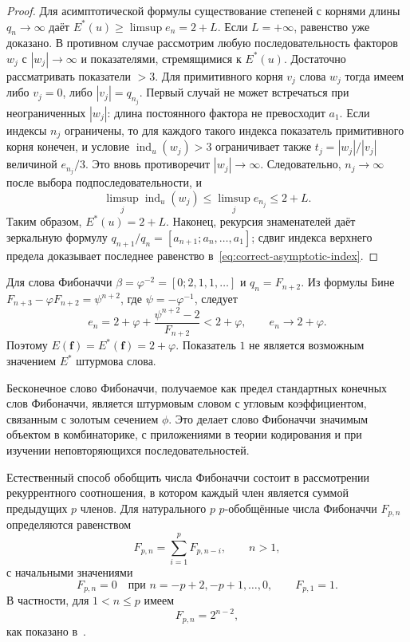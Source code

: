 \documentclass[a4paper,14pt]{extreport}
\theoremstyle{plain}
\theoremstyle{definition}
\theoremstyle{remark}
\begin{document}
\begin{proof}
Для асимптотической формулы существование степеней с корнями
длины $q_n\to\infty$ даёт
$E^*(u)\ge\limsup e_n=2+L$.
Если $L=+\infty$, равенство уже доказано.
В противном случае рассмотрим любую последовательность факторов
$w_j$ с $|w_j|\to\infty$ и показателями, стремящимися к $E^*(u)$.
Достаточно рассматривать показатели $>3$.
Для примитивного корня $v_j$ слова $w_j$ тогда имеем
либо $v_j=0$, либо $|v_j|=q_{n_j}$.
Первый случай не может встречаться при неограниченных $|w_j|$:
длина постоянного фактора не превосходит $a_1$.
Если индексы $n_j$ ограничены, то для каждого такого индекса
показатель примитивного корня конечен, и условие
$\operatorname{ind}_u(w_j)>3$ ограничивает также
$t_j=|w_j|/|v_j|$ величиной $e_{n_j}/3$.
Это вновь противоречит $|w_j|\to\infty$.
Следовательно, $n_j\to\infty$ после выбора подпоследовательности, и
\[
 \limsup_j\operatorname{ind}_u(w_j)
 \le\limsup_j e_{n_j}\le2+L.
\]
Таким образом, $E^*(u)=2+L$.
Наконец, рекурсия знаменателей даёт зеркальную формулу
$q_{n+1}/q_n=[a_{n+1};a_n,\ldots,a_1]$;
сдвиг индекса верхнего предела доказывает последнее равенство
в~\eqref{eq:correct-asymptotic-index}.
\end{proof}

\noindent Для слова Фибоначчи
$\beta=\varphi^{-2}=[0;2,1,1,\ldots]$ и $q_n=F_{n+2}$.
Из формулы Бине
$F_{n+3}-\varphi F_{n+2}=\psi^{n+2}$, где $\psi=-\varphi^{-1}$,
следует
\[
 e_n=2+\varphi+\frac{\psi^{n+2}-2}{F_{n+2}}<2+\varphi,
 \qquad e_n\longrightarrow2+\varphi.
\]
Поэтому $E(\mathbf f)=E^*(\mathbf f)=2+\varphi$.
Показатель $1$ не является возможным значением $E^*$ штурмова слова.

Бесконечное слово Фибоначчи, получаемое как предел стандартных конечных слов Фибоначчи, является штурмовым словом с угловым коэффициентом, связанным с золотым сечением $\phi$. Это делает слово Фибоначчи значимым объектом в комбинаторике, с приложениями в теории кодирования и при изучении неповторяющихся последовательностей.

Естественный способ обобщить числа Фибоначчи состоит в рассмотрении рекуррентного соотношения, в котором каждый член является суммой предыдущих $p$ членов. Для натурального $p$ $p$-обобщённые числа Фибоначчи $F_{p,n}$ определяются равенством
\begin{equation}\label{eq3duaafib}
	F_{p,n} = \sum_{i=1}^{p} F_{p,n-i}, \qquad n > 1,
\end{equation}
с начальными значениями
\begin{equation}
	F_{p,n} = 0 \quad\text{при } n = -p+2,-p+1,\dots,0,
	\qquad
	F_{p,1} = 1.
\end{equation}
В частности, для $1 < n \leq p$ имеем
\begin{equation}
	F_{p,n} = 2^{n-2},
\end{equation}
как показано в~\cite{PulidoRamirez}.
\end{document}
